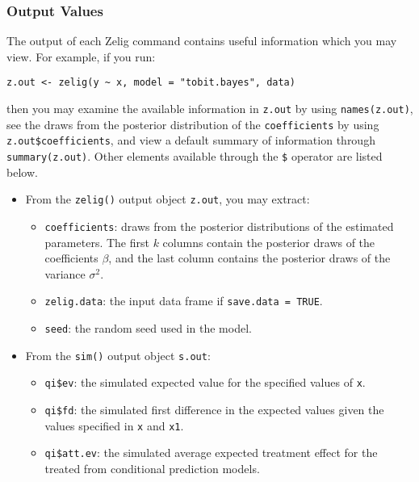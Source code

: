 \subsubsection{Output Values}

The output of each Zelig command contains useful information which you may
view. For example, if you run:
\begin{verbatim}
z.out <- zelig(y ~ x, model = "tobit.bayes", data)
\end{verbatim}

\noindent then you may examine the available information in \texttt{z.out} by
using \texttt{names(z.out)}, see the draws from the posterior distribution of
the \texttt{coefficients} by using \texttt{z.out\$coefficients}, and view a 
default summary of information through \texttt{summary(z.out)}. Other elements
available through the \texttt{\$} operator are listed below.

\begin{itemize}
\item From the \texttt{zelig()} output object \texttt{z.out}, you may extract:

\begin{itemize}
\item \texttt{coefficients}: draws from the posterior distributions
of the estimated parameters. The first $k$ columns contain the posterior draws
of the coefficients $\beta$, and the last column contains the posterior draws 
of the variance $\sigma^2$.

   \item {\tt zelig.data}: the input data frame if {\tt save.data = TRUE}.  
\item \texttt{seed}: the random seed used in the model.

\end{itemize}

\item From the \texttt{sim()} output object \texttt{s.out}:

\begin{itemize}
\item \texttt{qi\$ev}: the simulated expected value for the specified
  values of \texttt{x}.

\item \texttt{qi\$fd}: the simulated first difference in the expected
  values given the values specified in \texttt{x} and \texttt{x1}.

\item \texttt{qi\$att.ev}: the simulated average expected treatment
  effect for the treated from conditional prediction models.

\end{itemize}
\end{itemize}

